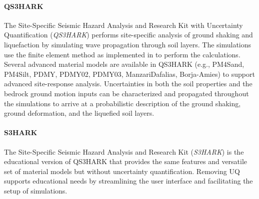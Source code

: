 \paragraph{QS3HARK} The Site-Specific Seismic Hazard Analysis and Research Kit with Uncertainty Quantification (\emph{QS3HARK}) performs site-specific analysis of ground shaking and liquefaction by simulating wave propagation through soil layers. The simulations use the finite element method as implemented in  to perform the calculations. Several advanced material models are available in QS3HARK (e.g., PM4Sand, PM4Silt, PDMY, PDMY02, PDMY03, ManzariDafalias, Borja-Amies) to support advanced site-response analysis. Uncertainties in both the soil properties and the bedrock ground motion inputs can be characterized and propagated throughout the simulations to arrive at a probabilistic description of the ground shaking, ground deformation, and the liquefied soil layers.

\paragraph{S3HARK} The Site-Specific Seismic Hazard Analysis and Research Kit (\emph{S3HARK}) is the educational version of QS3HARK that provides the same features and versatile set of material models but without uncertainty quantification. Removing UQ supports educational needs by streamlining the user interface and facilitating the setup of simulations.
